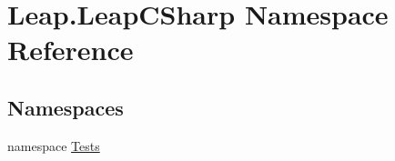 \hypertarget{namespace_leap_1_1_leap_c_sharp}{}\section{Leap.\+Leap\+C\+Sharp Namespace Reference}
\label{namespace_leap_1_1_leap_c_sharp}
\subsection*{Namespaces}
\begin{DoxyCompactItemize}
\item 
namespace \mbox{\hyperlink{namespace_leap_1_1_leap_c_sharp_1_1_tests}{Tests}}
\end{DoxyCompactItemize}
